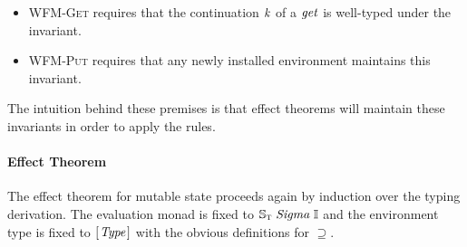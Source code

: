 \begin{itemize}
\item \textsc{WFM-Get} requires that the continuation \ensuremath{\Varid{k}} of a
\ensuremath{\Varid{get}} is well-typed under the invariant.

\item \textsc{WFM-Put} requires that any newly installed
environment maintains this invariant.
\end{itemize}
The intuition behind these premises is that effect theorems will
maintain these invariants in order to apply the rules.



\paragraph{Effect Theorem}

The effect theorem for mutable state proceeds again by induction over
the typing derivation. The evaluation monad is fixed to \ensuremath{\mathbb{S}_{\scalebox{0.6}{T}}\;\Conid{Sigma}\;\mathbb{I}} and the environment type is fixed to \ensuremath{[\mskip1.5mu \Conid{Type}\mskip1.5mu]} with the obvious
definitions for $\supseteq$.

